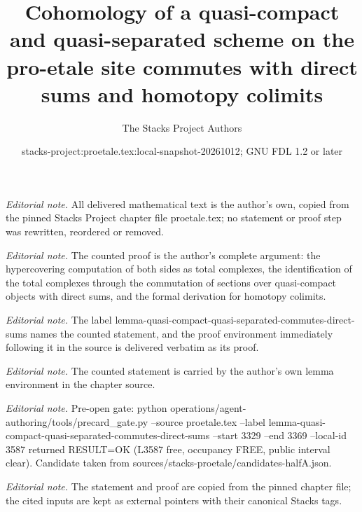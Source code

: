\documentclass[10pt,a4paper]{amsart}
\title{Cohomology of a quasi-compact and quasi-separated scheme on the pro-etale site commutes with direct sums and homotopy colimits}
\author{The Stacks Project Authors}
\date{stacks-project:proetale.tex:local-snapshot-20261012; GNU FDL 1.2 or later}
\theoremstyle{plain}
\theoremstyle{definition}
\theoremstyle{remark}
\numberwithin{equation}{subsection}
\begin{document}
\maketitle
\noindent\textit{Editorial note.} All delivered mathematical text is the author's own, copied from the pinned Stacks Project chapter file proetale.tex; no statement or proof step was rewritten, reordered or removed.\par\medskip
\noindent\textit{Editorial note.} The counted proof is the author's complete argument: the hypercovering computation of both sides as total complexes, the identification of the total complexes through the commutation of sections over quasi-compact objects with direct sums, and the formal derivation for homotopy colimits.\par\medskip
\noindent\textit{Editorial note.} The label lemma-quasi-compact-quasi-separated-commutes-direct-sums names the counted statement, and the proof environment immediately following it in the source is delivered verbatim as its proof.\par\medskip
\noindent\textit{Editorial note.} The counted statement is carried by the author's own lemma environment in the chapter source.\par\medskip
\noindent\textit{Editorial note.} Pre-open gate: python operations/agent-authoring/tools/precard\_gate.py --source proetale.tex --label lemma-quasi-compact-quasi-separated-commutes-direct-sums --start 3329 --end 3369 --local-id 3587 returned RESULT=OK (L3587 free, occupancy FREE, public interval clear). Candidate taken from sources/stacks-proetale/candidates-halfA.json.\par\medskip
\noindent\textit{Editorial note.} The statement and proof are copied from the pinned chapter file; the cited inputs are kept as external pointers with their canonical Stacks tags.\par\medskip
\end{document}
